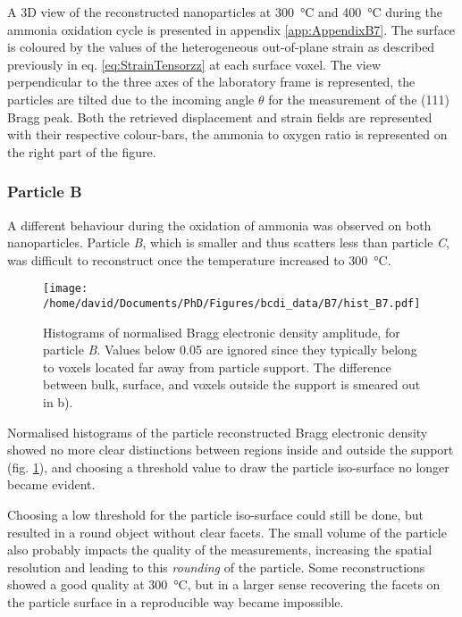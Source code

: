A 3D view of the reconstructed nanoparticles at \qty{300}{\degreeCelsius} and \qty{400}{\degreeCelsius} during the ammonia oxidation cycle is presented in appendix \ref{app:AppendixB7}.
The surface is coloured by the values of the heterogeneous out-of-plane strain as described previously in eq. \ref{eq:StrainTensorzz} at each surface voxel.
The view perpendicular to the three axes of the laboratory frame is represented, the particles are tilted due to the incoming angle $\theta$ for the measurement of the (111) Bragg peak.
Both the retrieved displacement and strain fields are represented with their respective colour-bars, the ammonia to oxygen ratio is represented on the right part of the figure.

\subsubsection{Particle B}

A different behaviour during the oxidation of ammonia was observed on both nanoparticles.
Particle \textit{B}, which is smaller and thus scatters less than particle \textit{C}, was difficult to reconstruct once the temperature increased to \qty{300}{\degreeCelsius}.

\begin{figure}[!htb]
    \centering
    \texttt{[image: /home/david/Documents/PhD/Figures/bcdi\_data/B7/hist\_B7.pdf]}
    \caption{
        Histograms of normalised Bragg electronic density amplitude, for particle \textit{B}.
        Values below 0.05 are ignored since they typically belong to voxels located far away from particle support.
        The difference between bulk, surface, and voxels outside the support is smeared out in b).
    }
    \label{fig:B7Histo}
\end{figure}

Normalised histograms of the particle reconstructed Bragg electronic density showed no more clear distinctions between regions inside and outside the support (fig. \ref{fig:B7Histo}), and choosing a threshold value to draw the particle iso-surface no longer became evident.

Choosing a low threshold for the particle iso-surface could still be done, but resulted in a round object without clear facets.
The small volume of the particle also probably impacts the quality of the measurements, increasing the spatial resolution and leading to this \textit{rounding} of the particle.
Some reconstructions showed a good quality at \qty{300}{\degreeCelsius}, but in a larger sense recovering the facets on the particle surface in a reproducible way became impossible.

